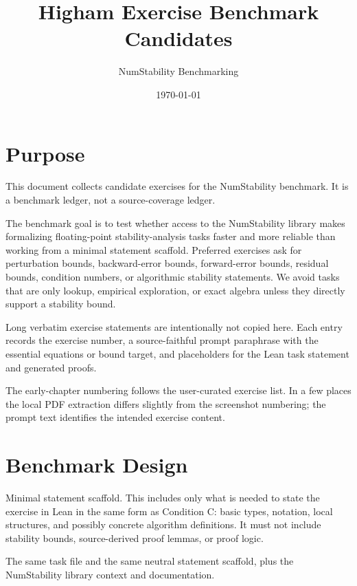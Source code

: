 \documentclass[11pt]{article}
\title{Higham Exercise Benchmark Candidates}
\author{NumStability Benchmarking}
\date{\today}
\begin{document}
\maketitle

\section{Purpose}

This document collects candidate exercises for the NumStability benchmark.
It is a benchmark ledger, not a source-coverage ledger.

The benchmark goal is to test whether access to the NumStability library
makes formalizing floating-point stability-analysis tasks faster and more
reliable than working from a minimal statement scaffold.  Preferred exercises ask for
perturbation bounds, backward-error bounds, forward-error bounds, residual
bounds, condition numbers, or algorithmic stability statements.  We avoid
tasks that are only lookup, empirical exploration, or exact algebra unless
they directly support a stability bound.

Long verbatim exercise statements are intentionally not copied here.  Each
entry records the exercise number, a source-faithful prompt paraphrase with
the essential equations or bound target, and placeholders for the Lean task
statement and generated proofs.

The early-chapter numbering follows the user-curated exercise list.  In a few
places the local PDF extraction differs slightly from the screenshot numbering;
the prompt text identifies the intended exercise content.

\section{Benchmark Design}

\begin{description}[style=nextline,leftmargin=3.2cm,font=\normalfont\bfseries]
  \item[Condition A] Minimal statement scaffold.  This includes only what is
  needed to state the exercise in Lean in the same form as Condition C: basic
  types, notation, local structures, and possibly concrete algorithm definitions.
  It must not include stability bounds, source-derived proof lemmas, or proof
  logic.
  \item[Condition C] The same task file and the same neutral statement scaffold,
  plus the NumStability library context and documentation.
\end{description}
\end{document}
